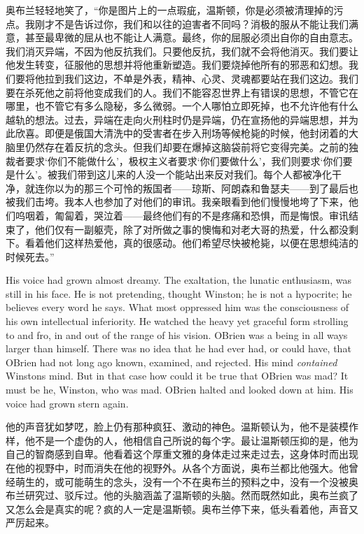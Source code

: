 \begin{paracol}{2}
奥布兰轻轻地笑了，``你是图片上的一点瑕疵，温斯顿，你是必须被清理掉的污点。我刚才不是告诉过你，我们和以往的迫害者不同吗？消极的服从不能让我们满意，甚至最卑微的屈从也不能让人满意。最终，你的屈服必须出自你的自由意志。我们消灭异端，不因为他反抗我们。只要他反抗，我们就不会将他消灭。我们要让他发生转变，征服他的思想并将他重新塑造。我们要烧掉他所有的邪恶和幻想。我们要将他拉到我们这边，不单是外表，精神、心灵、灵魂都要站在我们这边。我们要在杀死他之前将他变成我们的人。我们不能容忍世界上有错误的思想，不管它在哪里，也不管它有多么隐秘，多么微弱。一个人哪怕立即死掉，也不允许他有什么越轨的想法。过去，异端在走向火刑柱时仍是异端，仍在宣扬他的异端思想，并为此欣喜。即便是俄国大清洗中的受害者在步入刑场等候枪毙的时候，他封闭着的大脑里仍然存在着反抗的念头。但我们却要在爆掉这脑袋前将它变得完美。之前的独裁者要求`你们不能做什么'，极权主义者要求`你们要做什么'，我们则要求`你们要是什么'。被我们带到这儿来的人没一个能站出来反对我们。每个人都被净化干净，就连你以为的那三个可怜的叛国者——琼斯、阿朗森和鲁瑟夫——到了最后也被我们击垮。我本人也参加了对他们的审讯。我亲眼看到他们慢慢地垮了下来，他们呜咽着，匍匐着，哭泣着——最终他们有的不是疼痛和恐惧，而是悔恨。审讯结束了，他们仅有一副躯壳，除了对所做之事的懊悔和对老大哥的热爱，什么都没剩下。看着他们这样热爱他，真的很感动。他们希望尽快被枪毙，以便在思想纯洁的时候死去。''

\switchcolumn*

His voice had grown almost dreamy. The exaltation, the lunatic
enthusiasm, was still in his face. He is not pretending, thought
Winston; he is not a hypocrite; he believes every word he says. What
most oppressed him was the consciousness of his own intellectual
inferiority. He watched the heavy yet graceful form strolling to and
fro, in and out of the range of his vision. O\textquotesingle Brien was
a being in all ways larger than himself. There was no idea that he had
ever had, or could have, that O\textquotesingle Brien had not long ago
known, examined, and rejected. His mind \emph{contained}
Winston\textquotesingle s mind. But in that case how could it be true
that O\textquotesingle Brien was mad? It must be he, Winston, who was
mad. O\textquotesingle Brien halted and looked down at him. His voice
had grown stern again.

\switchcolumn

他的声音犹如梦呓，脸上仍有那种疯狂、激动的神色。温斯顿认为，他不是装模作样，他不是一个虚伪的人，他相信自己所说的每个字。最让温斯顿压抑的是，他为自己的智商感到自卑。他看着这个厚重文雅的身体走过来走过去，这身体时而出现在他的视野中，时而消失在他的视野外。从各个方面说，奥布兰都比他强大。他曾经萌生的，或可能萌生的念头，没有一个不在奥布兰的预料之中，没有一个没被奥布兰研究过、驳斥过。他的头脑涵盖了温斯顿的头脑。然而既然如此，奥布兰疯了又怎么会是真实的呢？疯的人一定是温斯顿。奥布兰停下来，低头看着他，声音又严厉起来。


\end{paracol}
